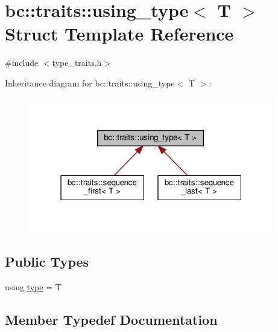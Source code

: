 \hypertarget{structbc_1_1traits_1_1using__type}{}\section{bc\+:\+:traits\+:\+:using\+\_\+type$<$ T $>$ Struct Template Reference}
\label{structbc_1_1traits_1_1using__type}


{\ttfamily \#include $<$type\+\_\+traits.\+h$>$}



Inheritance diagram for bc\+:\+:traits\+:\+:using\+\_\+type$<$ T $>$\+:\nopagebreak
\begin{figure}[H]
\begin{center}
\leavevmode
\includegraphics[width=304pt]{structbc_1_1traits_1_1using__type__inherit__graph}
\end{center}
\end{figure}
\subsection*{Public Types}
\begin{DoxyCompactItemize}
\item 
using \hyperlink{structbc_1_1traits_1_1using__type_a5050f5559333f1af265d26c146de11df}{type} = T
\end{DoxyCompactItemize}


\subsection{Member Typedef Documentation}
\mbox{\label{structbc_1_1traits_1_1using__type_a5050f5559333f1af265d26c146de11df}} 
